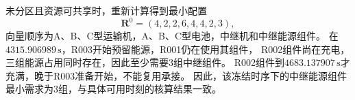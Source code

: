 未分区且资源可共享时，重新计算得到最小配置
\begin{equation}
\boldsymbol R^0=(4,2,2,6,4,4,2,3),
\end{equation}
向量顺序为A、B、C型运输机，A、B、C型电池，中继机和中继能源组件。
在$4315.906989\,\mathrm{s}$，R003开始预留能源，R001仍在使用其组件，
R002组件尚在充电，三组能源占用同时存在，因此至少需要3组中继组件。
R002组件到$4683.137907\,\mathrm{s}$才充满，晚于R003准备开始，不能复用承接。
因此，该冻结时序下的中继能源组件最小需求为3组，与具体可用时刻的核算结果一致。
